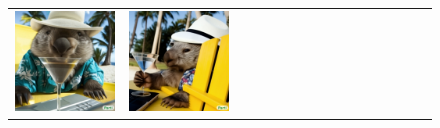 \begin{figure}[ht!]
\begin{adjustwidth}{-0.8in}{-0.5in}
\begin{tabular}{cccccccccccccccccccc}
\multicolumn{3}{c}{\includegraphics[width=\twobytwocolwidth\textwidth]{figures/cherries/wombat1.jpg}} &
\multicolumn{3}{c}{\includegraphics[width=\twobytwocolwidth\textwidth]{figures/cherries/wombat2.jpg}} &&

\end{tabular}
\end{adjustwidth}
\end{figure}

